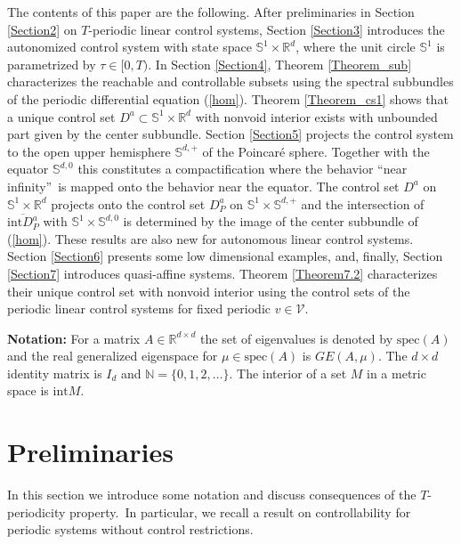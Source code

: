 \documentclass{siamltex}%
\begin{document}
The contents of this paper are the following. After preliminaries in Section
\ref{Section2} on $T$-periodic linear control systems, Section \ref{Section3}
introduces the autonomized control system with state space $\mathbb{S}%
^{1}\times\mathbb{R}^{d}$, where the unit circle $\mathbb{S}^{1}$ is
parametrized by $\tau\in\lbrack0,T)$. In Section \ref{Section4}, Theorem
\ref{Theorem_sub} characterizes the reachable and controllable subsets using
the spectral subbundles of the periodic differential equation (\ref{hom}).
Theorem \ref{Theorem_cs1} shows that a unique control set $D^{a}%
\subset\mathbb{S}^{1}\times\mathbb{R}^{d}$ with nonvoid interior exists with
unbounded part given by the center subbundle. Section \ref{Section5} projects
the control system to the open upper hemisphere $\mathbb{S}^{d,+}$ of the
Poincar\'{e} sphere. Together with the equator $\mathbb{S}^{d,0}$ this
constitutes a compactification where the behavior \textquotedblleft near
infinity\textquotedblright\ is mapped onto the behavior near the equator. The
control set $D^{a}$ on $\mathbb{S}^{1}\times\mathbb{R}^{d}$ projects onto the
control set $D_{P}^{a}$ on $\mathbb{S}^{1}\times\mathbb{S}^{d,+}$ and the
intersection of $\overline{\mathrm{int}D_{P}^{a}}$ with $\mathbb{S}^{1}%
\times\mathbb{S}^{d,0}$ is determined by the image of the center subbundle of
(\ref{hom}). These results are also new for autonomous linear control systems.
Section \ref{Section6} presents some low dimensional examples, and, finally,
Section \ref{Section7} introduces quasi-affine systems. Theorem
\ref{Theorem7.2} characterizes their unique control set with nonvoid interior
using the control sets of the periodic linear control systems for fixed
periodic $v\in\mathcal{V}$.

\textbf{Notation:} For a matrix $A\in\mathbb{R}^{d\times d}$ the set of
eigenvalues is denoted by $\mathrm{spec}(A)$ and the real generalized
eigenspace for $\mu\in\mathrm{spec}(A)$ is $GE(A,\mu)$. The $d\times d$
identity matrix is $I_{d}$ and $\mathbb{N}=\{0,1,2,\ldots\}$. The interior of
a set $M$ in a metric space is $\mathrm{int}M$.

\section{Preliminaries\label{Section2}}

In this section we introduce some notation and discuss consequences of the
$T$-periodicity property.\ In particular, we recall a result on
controllability for periodic systems without control restrictions.
\end{document}
